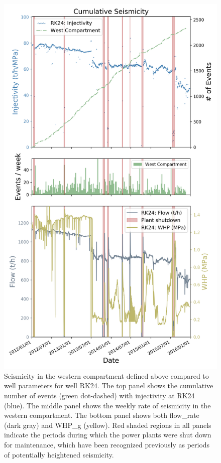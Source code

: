 \begin{figure}[p]
\begin{center}
\includegraphics[width=0.75\columnwidth]{Chapter_4_Rot/figures/Rot_dets_GC_two_panel_WHP-flow_west_compartment_RK24/Rot_dets_GC_three_panel_II-rate-WHP_west_compartment_RK24}
\caption[Western compartment seismicity and RK24 injection parameters]{{
Seismicity in the western compartment defined above compared to well
parameters for well RK24. The top panel shows the cumulative number of
events (green dot-dashed) with \gls{injectivity} at RK24 (blue). The middle
panel shows the weekly rate of seismicity in the western compartment.
The bottom panel shows both \gls{flow_rate} (dark gray) and \gls{WHP_g}
(yellow). Red shaded regions in all panels indicate the periods during
which the power plants were shut down for maintenance, which have been
recognized previously as periods of potentially heightened seismicity.
{\label{108171}}%
}}
\end{center}
\end{figure}

